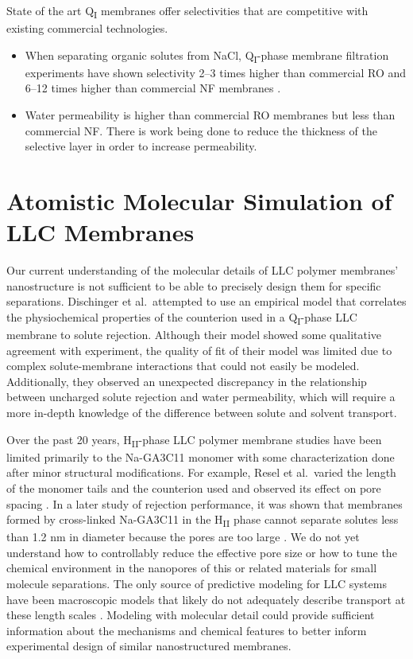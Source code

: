   
  State of the art Q\textsubscript{I} membranes offer selectivities that
  are competitive with existing commercial technologies.
  \begin{itemize}
    \item When separating organic solutes from NaCl, Q\textsubscript{I}-phase
    membrane filtration experiments have shown selectivity 2--3 times higher than
    commercial RO and 6--12 times higher than commercial NF membranes
    \cite{dischinger_application_2017}.
    \item Water permeability is higher than commercial RO membranes but
    less than commercial NF. There is work being done to reduce the
    thickness of the selective layer in order to increase permeability. 
  \end{itemize}

  \section{Atomistic Molecular Simulation of LLC Membranes}
  
  Our current understanding of the molecular details of LLC polymer membranes'
  nanostructure is not sufficient to be able to precisely design them for
  specific separations. Dischinger et al.~attempted to use an empirical model
  that correlates the physiochemical properties of the counterion used in a
  Q\textsubscript{I}-phase LLC membrane to solute rejection\cite{dischinger_effect_2017}.
  Although their model showed some qualitative agreement with experiment, the
  quality of fit of their model was limited due to complex solute-membrane
  interactions that could not easily be modeled. Additionally, they observed
  an unexpected discrepancy in the relationship between uncharged solute
  rejection and water permeability, which will require a more in-depth knowledge of
  the difference between solute and solvent transport.

  Over the past 20 years, H\textsubscript{II}-phase LLC polymer membrane
  studies have been limited primarily to the Na-GA3C11 monomer with some
  characterization done after minor structural modifications. For example, Resel
  et al.~varied the length of the monomer tails and the counterion used and
  observed its effect on pore spacing \cite{resel_structural_2000}. In a later
  study of rejection performance, it was shown that membranes formed by
  cross-linked Na-GA3C11 in the H\textsubscript{II} phase cannot separate solutes
  less than 1.2 nm in diameter because the pores are too large
  \cite{zhou_supported_2005}. We do not yet understand how to controllably reduce
  the effective pore size or how to tune the chemical environment in the
  nanopores of this or related materials for small molecule separations. The only
  source of predictive modeling for LLC systems have been macroscopic models that
  likely do not adequately describe transport at these length scales
  \cite{hatakeyama_water_2011}. Modeling with molecular detail could provide
  sufficient information about the mechanisms and chemical features to better
  inform experimental design of similar nanostructured membranes.
  
